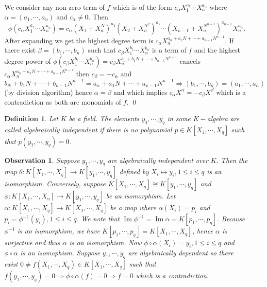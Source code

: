 \documentclass[11pt]{amsart}
\newtheorem{defn}[theorem]{Definition}
\newtheorem{obs}[theorem]{Observation}
\DeclareMathOperator{\im}{\text{Im}}
\begin{document}
\proof We consider any non zero term of $f$ which is of the form $c_\alpha X_1^{a_1}\cdots X_n^{a_n}$ where $\alpha=(a_1,\cdots,a_n)$ and $c_\alpha\neq 0.$ Then $$\phi(c_\alpha X_1^{a_1}\cdots X_n^{a_n})=c_\alpha \left(X_1+X_n^N\right)^{a_1}\left(X_2+X_n^{N^2}\right)^{a_2}\cdots\left(X_{n-1}+X_n^{N^{n-1}}\right)^{a_{n-1}} X_n^{a_n}.$$
After expanding we get the highest degree term is $c_\alpha X_n^{a_n+a_1N+\cdots+a_{n-1}N^{n-1}}.$ If there exist $\beta=(b_1,\cdots,b_n)$ such that $c_\beta X_1^{b_1}\cdots X_n^{b_n}$ is a term of $f$ and the highest degree power of $\phi(c_\beta X_1^{b_1}\cdots X_n^{b_n})=c_\beta X_n^{b_n+b_1N+\cdots+b_{n-1}N^{n-1}}$ cancels $c_\alpha X_n^{a_n+a_1N+\cdots+a_{n-1}N^{n-1}}$ then $c_\beta=-c_\alpha$ and $b_N+b_1N+\cdots+b_{n-1}N^{n-1}=a_n+a_1N+\cdots+a_{n-1}N^{n-1} \Rightarrow (b_1,\cdots,b_n)=(a_1,\cdots,a_n)$ (by division algorithm) hence $\alpha=\beta$ and which implies $c_\alpha X^\alpha=-c_\beta X^\beta$ which is a contradiction as both are monomials of $f.$ \qed

\begin{defn}

Let $K$ be a field. The elements $y_1,\cdots,y_q$ in some $K-$algebra are called algebraically independent if there is no polynomial $p\in K[X_1,\cdots,X_q]$ such that $p(y_1,\cdots, y_q)=0.$

\end{defn}

\begin{obs}

Suppose $y_1,\cdots,y_q$ are algebraically independent over $K$. Then the map $\theta:K[X_1,\cdots,X_q]\to K[y_1,\cdots,y_q]$ defined by $X_i\mapsto y_i,1\leq i\leq q$ is an isomorphism. Conversely, suppose $K[X_1,\cdots, X_q]\cong K[y_1,\cdots, y_q]$ and $\phi:K[X_1,\cdots,X_n]\to K[y_1,\cdots, y_q]$ be an isomorphism. Let $\alpha:K[X_1,\cdots,X_q]\to K[X_1,\cdots, X_q]$ be a map where $\alpha(X_i)=p_i$ and $p_i=\phi^{-1}(y_i),1\leq i \leq q$. We note that $\im \phi^{-1}=\im \alpha=K[p_1,\cdots,p_q]$. Because $\phi^{-1}$ is an isomorphism, we have $K[p_1,\cdots,p_q]=K[X_1,\cdots,X_q]$, hence $\alpha$ is surjective and thus $\alpha$ is an isomorphism. Now $\phi\circ \alpha(X_i)=y_i,1\leq i\leq q$ and $\phi\circ \alpha$ is an isomophism. Suppose $y_1,\cdots, y_q$ are algebraically dependent so there exist $0\neq f(X_1,\cdots, X_q)\in K[X_1,\cdots, X_q]$ such that $f(y_1,\cdots,y_q)=0 \Rightarrow \phi\circ \alpha(f)=0 \Rightarrow f=0$ which is a contradiction.

\end{obs}
\end{document}
